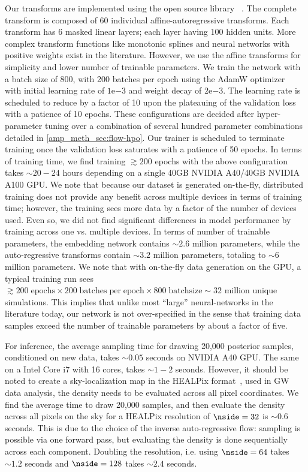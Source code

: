 \begin{refsection}
Our transforms are implemented using the open source library {\pyro}~\cite{JMLR:v20:18-403}. 
The complete transform is composed of 60 individual affine-autoregressive transforms. 
Each transform has 6 masked linear layers; each layer having 100 hidden units. 
More complex transform functions like monotonic splines and neural networks with positive weights exist in the literature. 
However, we use the affine transforms for simplicity and lower number of trainable parameters. 
We train the network with a batch size of 800, with 200 batches per epoch using the AdamW optimizer~\cite{loshchilov2019decoupledweightdecayregularization} with initial learning rate of $1\mathrm{e}{-3}$ and weight decay of $2\mathrm{e}{-3}$. 
The learning rate is scheduled to reduce by a factor of 10 upon the plateauing of the validation loss with a patience of 10 epochs. 
These configurations are decided after hyper-parameter tuning over a combination of several hundred parameter combinations detailed in \ref{amp_meth_sec:flow-hpo}.
Our trainer is scheduled to terminate training once the validation loss saturates with a patience of 50 epochs. 
In terms of training time, we find training $\gtrsim 200$ epochs with the above configuration takes $\sim 20-24$ hours depending on a single 40GB NVIDIA A40/40GB NVIDIA A100
GPU.
We note that because our dataset is generated on-the-fly, distributed training does not provide any benefit across multiple devices in terms of training time; however, the training sees more data by a factor of the number of devices used. 
Even so, we did not find significant differences in model performance by training across one vs. multiple devices. 
In terms of number of trainable parameters, the embedding network contains $\sim 2.6$ million parameters, while the auto-regressive transforms contain $\sim 3.2$ million parameters, totaling to $\sim 6$ million parameters. 
We note that with on-the-fly data generation on the GPU, a typical training run sees $\gtrsim 200\;\mathrm{epochs} \times 200\;\mathrm{batches\;per\;epoch} \times 800\;\mathrm{batch size} \sim 32$ million unique simulations. 
This implies that unlike most ``large'' neural-networks in the literature today, our network is not over-specified in the sense that training data samples exceed the number of trainable parameters by about a factor of five.

For inference, the average sampling time for drawing 20,000 posterior samples, conditioned on new data, takes $\sim 0.05$ seconds on NVIDIA A40 GPU. 
The same on a Intel Core i7 with 16 cores, takes $\sim 1-2$ seconds. 
However, it should be noted to create a sky-localization map in the HEALPix format~\cite{GoHi2005}, used in GW data analysis, the density needs to be evaluated across all pixel coordinates. 
We find the average time to draw 20,000 samples, and then evaluate the density across all pixels on the sky for a HEALPix resolution of $\nside=32$ is $\sim 0.6$ seconds. 
This is due to the choice of the inverse auto-regressive flow: sampling is possible via one forward pass, but evaluating the density is done sequentially across each component. 
Doubling the resolution, i.e. using $\nside = 64$ takes $\sim 1.2$ seconds and $\nside = 128$ takes $\sim 2.4$ seconds.


\end{refsection}
